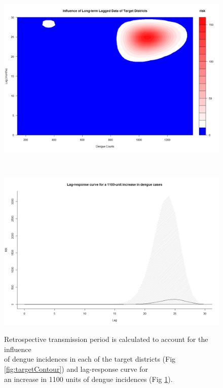 \documentclass{bmcart}
\begin{document}
\begin{figure}[htbp]
	\centering
	\begin{minipage}{0.8\textwidth}
		\centering
		\includegraphics[width= 1.1\textwidth]{8-LongLagContour}
		\subcaption{}
		\label{fig:targetContour}
	\end{minipage}%
	\\[1.5ex]
	\begin{minipage}{0.8\textwidth}
		\centering
		\includegraphics[width= 1.1\textwidth]{9-LagResposeLongLag}
		\subcaption{}
		\label{fig:lagPeak}
	\end{minipage}
	\caption{Retrospective transmission period is calculated to account for the influence \\ of dengue incidences in each of the target districts (Fig \ref{fig:targetContour}) and lag-response curve for \\ an increase in 1100 units of dengue incidences (Fig \ref{fig:lagPeak}).}
\end{figure}
\end{document}
